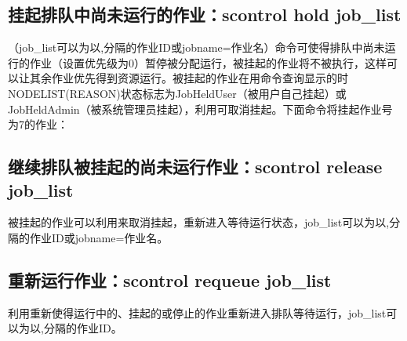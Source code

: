 
\subsection{挂起排队中尚未运行的作业：scontrol hold job\_list}
（job\_list可以为以,分隔的作业ID或jobname=作业名）命令可使得排队中尚未运行的作业（设置优先级为0）暂停被分配运行，被挂起的作业将不被执行，这样可以让其余作业优先得到资源运行。被挂起的作业在用命令查询显示的时NODELIST(REASON)状态标志为JobHeldUser（被用户自己挂起）或JobHeldAdmin（被系统管理员挂起），利用可取消挂起。下面命令将挂起作业号为7的作业：


\subsection{继续排队被挂起的尚未运行作业：scontrol release job\_list}
被挂起的作业可以利用来取消挂起，重新进入等待运行状态，job\_list可以为以,分隔的作业ID或jobname=作业名。


%
%
%

\subsection{重新运行作业：scontrol requeue job\_list}
利用重新使得运行中的、挂起的或停止的作业重新进入排队等待运行，job\_list可以为以,分隔的作业ID。

